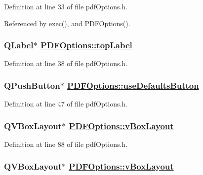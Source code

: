 Definition at line 33 of file pdf\-Options.h.

Referenced by exec(), and PDFOptions().\hypertarget{classPDFOptions_r3}{
\subsubsection[topLabel]{\setlength{\rightskip}{0pt plus 5cm}QLabel$\ast$ \hyperlink{classPDFOptions_r3}{PDFOptions::top\-Label}}}
\label{classPDFOptions_r3}


Definition at line 38 of file pdf\-Options.h.\hypertarget{classPDFOptions_r12}{
\subsubsection[useDefaultsButton]{\setlength{\rightskip}{0pt plus 5cm}QPush\-Button$\ast$ \hyperlink{classPDFOptions_r12}{PDFOptions::use\-Defaults\-Button}}}
\label{classPDFOptions_r12}


Definition at line 47 of file pdf\-Options.h.\hypertarget{classPDFOptions_r45}{
\subsubsection[vBoxLayout]{\setlength{\rightskip}{0pt plus 5cm}QVBox\-Layout$\ast$ \hyperlink{classPDFOptions_r2}{PDFOptions::v\-Box\-Layout}}}
\label{classPDFOptions_r45}


Definition at line 88 of file pdf\-Options.h.\hypertarget{classPDFOptions_r15}{
\subsubsection[vBoxLayout]{\setlength{\rightskip}{0pt plus 5cm}QVBox\-Layout$\ast$ \hyperlink{classPDFOptions_r2}{PDFOptions::v\-Box\-Layout}}}
\label{classPDFOptions_r15}


